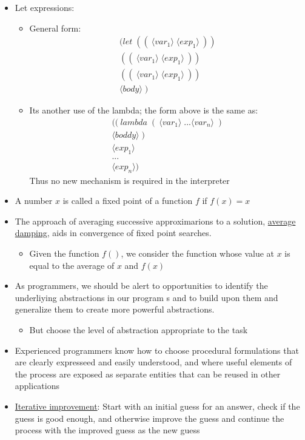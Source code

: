 \documentclass{article}
\begin{document}
\begin{itemize}
\item Let expressions:
  \begin{itemize}
  \item General form:
    \begin{equation}
      \begin{split}
        (let \;((\:\langle var_1 \rangle \;\langle exp_1 \rangle\:)) \\
        ((\:\langle var_1 \rangle \;\langle exp_1 \rangle\:)) \\
        ((\:\langle var_1 \rangle \;\langle exp_1 \rangle\:)) \\
        \langle body \rangle\;)
      \end{split}
    \end{equation}
    \item Its another use of the lambda; the form above is the same as:
    \begin{equation}
      \begin{split}
        ((\:lambda\;(\:\langle var_1 \rangle\;...\langle var_n \rangle\;) \\
        \langle boddy \rangle\;) \\
        \langle exp_1 \rangle \\
        ... \\
        \langle exp_n \rangle)
      \end{split}
    \end{equation}
    Thus no new mechanism is required in the interpreter
  \end{itemize}
\item A number $x$ is called a fixed point of a function $f$ if $f(x) = x$
\item The approach of averaging successive approximarions to a solution, \underline{average damping}, aids in convergence of fixed point searches.
  \begin{itemize}
  \item Given the function $f()$, we consider the function whose value at $x$ is equal to the average of $x$ and $f(x)$
  \end{itemize}
\item As programmers, we should be alert to opportunities to identify the underliying abstractions in our program s and to build upon them and generalize them to create more powerful abstractions.
  \begin{itemize}
  \item But choose the level of abstraction appropriate to the task
  \end{itemize}
\item Experienced programmers know how to choose procedural formulations that are clearly expresseed and easily understood, and where useful elements of the process are exposed as separate entities that can be reused in other applications
  \item \underline{Iterative improvement}: Start with an initial guess for an answer, check if the guess is good enough, and otherwise improve the guess and continue the process with the improved guess as the new guess
\end{itemize}
\end{document}
